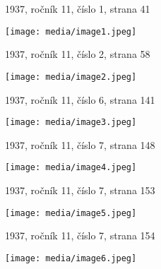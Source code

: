 1937, ročník 11, číslo 1, strana 41

\texttt{[image: media/image1.jpeg]}

1937, ročník 11, číslo 2, strana 58

\texttt{[image: media/image2.jpeg]}

1937, ročník 11, číslo 6, strana 141

\texttt{[image: media/image3.jpeg]}

1937, ročník 11, číslo 7, strana 148

\texttt{[image: media/image4.jpeg]}

1937, ročník 11, číslo 7, strana 153

\texttt{[image: media/image5.jpeg]}

1937, ročník 11, číslo 7, strana 154

\texttt{[image: media/image6.jpeg]}
